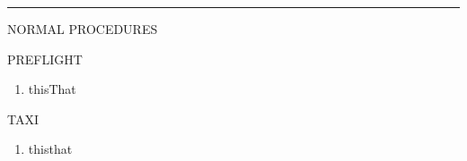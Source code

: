 \documentclass[11pt,letterpaper]{article}
\newcommand*{\doctitle}[1]{{\Huge\sf#1}} %
\newcommand*{\protitle}[1]{{\Large\sf#1}} %
\newcommand*{\proitem}[2]{\item#1\dotfill#2} %
\newcommand*{\separator}{\noindent\rule{\textwidth}{1pt}\vspace{0.25in}}
\newenvironment{prolist}[1]
	{\begin{center}
	\protitle{#1}
	\begin{enumerate}}
	{\end{enumerate}
	\end{center}}
\begin{document}
\separator

\centering

\doctitle{NORMAL PROCEDURES}

	\begin{multicols}{2}

	\begin{prolist}{PREFLIGHT}
		\proitem{this}{That}
	\end{prolist}



	\begin{prolist}{TAXI}
		\proitem{this}{that}
	\end{prolist}

	\end{multicols}
\end{document}
